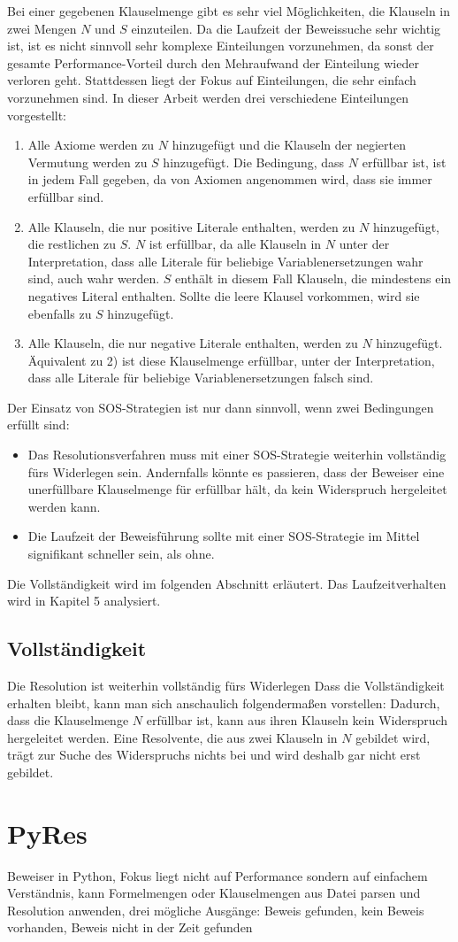 Bei einer gegebenen Klauselmenge gibt es sehr viel Möglichkeiten, die Klauseln in zwei Mengen $N$ und $S$ einzuteilen. Da die Laufzeit der Beweissuche sehr wichtig ist, ist es nicht sinnvoll sehr komplexe Einteilungen vorzunehmen, da sonst der gesamte Performance-Vorteil durch den Mehraufwand der Einteilung wieder verloren geht. Stattdessen liegt der Fokus auf Einteilungen, die sehr einfach vorzunehmen sind. In dieser Arbeit werden drei verschiedene Einteilungen vorgestellt:
\begin{enumerate}
	\item Alle Axiome werden zu $N$ hinzugefügt und die Klauseln der negierten Vermutung werden zu $S$ hinzugefügt. Die Bedingung, dass $N$ erfüllbar ist, ist in jedem Fall gegeben, da von Axiomen angenommen wird, dass sie immer erfüllbar sind.
	\item Alle Klauseln, die nur positive Literale enthalten, werden zu $N$ hinzugefügt, die restlichen zu $S$. $N$ ist erfüllbar, da alle Klauseln in $N$ unter der Interpretation, dass alle Literale für beliebige Variablenersetzungen wahr sind, auch wahr werden. $S$ enthält in diesem Fall Klauseln, die mindestens ein negatives Literal enthalten. Sollte die leere Klausel vorkommen, wird sie ebenfalls zu $S$ hinzugefügt.
	\item Alle Klauseln, die nur negative Literale enthalten, werden zu $N$ hinzugefügt. Äquivalent zu 2) ist diese Klauselmenge erfüllbar, unter der Interpretation, dass alle Literale für beliebige Variablenersetzungen falsch sind.
\end{enumerate}

Der Einsatz von SOS-Strategien ist nur dann sinnvoll, wenn zwei Bedingungen erfüllt sind:
\begin{itemize}
	\item Das Resolutionsverfahren muss mit einer SOS-Strategie weiterhin vollständig fürs Widerlegen sein. Andernfalls könnte es passieren, dass der Beweiser eine unerfüllbare Klauselmenge für erfüllbar hält, da kein Widerspruch hergeleitet werden kann.
	\item Die Laufzeit der Beweisführung sollte mit einer SOS-Strategie im Mittel signifikant schneller sein, als ohne.

\end{itemize}
Die Vollständigkeit wird im folgenden Abschnitt erläutert. Das Laufzeitverhalten wird in Kapitel 5 analysiert.

		\subsection{Vollständigkeit}		
Die Resolution ist weiterhin vollständig fürs Widerlegen \cite{Wos1965Sos}
Dass die Vollständigkeit erhalten bleibt, kann man sich anschaulich folgendermaßen vorstellen: Dadurch, dass die Klauselmenge $N$ erfüllbar ist, kann aus ihren Klauseln kein Widerspruch hergeleitet werden. Eine Resolvente, die aus zwei Klauseln in $N$ gebildet wird, trägt zur Suche des Widerspruchs nichts bei und wird deshalb gar nicht erst gebildet.
		
	\section{PyRes}
Beweiser in Python, Fokus liegt nicht auf Performance sondern auf einfachem Verständnis, kann Formelmengen oder Klauselmengen aus Datei parsen und Resolution anwenden, drei mögliche Ausgänge: Beweis gefunden, kein Beweis vorhanden, Beweis nicht in der Zeit gefunden